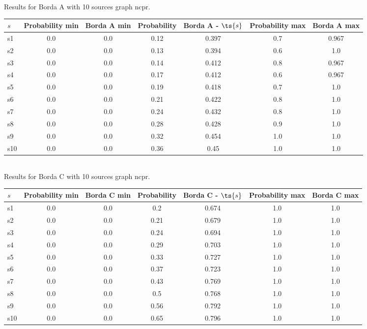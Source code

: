 \documentclass{article}
\begin{document}
\noindent Results for Borda A with 10 sources graph ncpr.

\noindent\begin{tabular}{|l|c|c|c|c|c|c|}
\hline
$s$& Probability min & Borda A min & Probability & Borda A - $\ts{s}$ & Probability max & Borda A max\\
\hline
s1 &0.0 & 0.0 & 0.12 & 0.397 & 0.7 & 0.967\\
\hline
s2 &0.0 & 0.0 & 0.13 & 0.394 & 0.6 & 1.0\\
\hline
s3 &0.0 & 0.0 & 0.14 & 0.412 & 0.8 & 0.967\\
\hline
s4 &0.0 & 0.0 & 0.17 & 0.412 & 0.6 & 0.967\\
\hline
s5 &0.0 & 0.0 & 0.19 & 0.418 & 0.7 & 1.0\\
\hline
s6 &0.0 & 0.0 & 0.21 & 0.422 & 0.8 & 1.0\\
\hline
s7 &0.0 & 0.0 & 0.24 & 0.432 & 0.8 & 1.0\\
\hline
s8 &0.0 & 0.0 & 0.28 & 0.428 & 0.9 & 1.0\\
\hline
s9 &0.0 & 0.0 & 0.32 & 0.454 & 1.0 & 1.0\\
\hline
s10 &0.0 & 0.0 & 0.36 & 0.45 & 1.0 & 1.0\\
\hline
\end{tabular}\\

\noindent Results for Borda C with 10 sources graph ncpr.

\noindent\begin{tabular}{|l|c|c|c|c|c|c|}
\hline
$s$& Probability min & Borda C min & Probability & Borda C - $\ts{s}$ & Probability max & Borda C max\\
\hline
s1 &0.0 & 0.0 & 0.2 & 0.674 & 1.0 & 1.0\\
\hline
s2 &0.0 & 0.0 & 0.21 & 0.679 & 1.0 & 1.0\\
\hline
s3 &0.0 & 0.0 & 0.24 & 0.694 & 1.0 & 1.0\\
\hline
s4 &0.0 & 0.0 & 0.29 & 0.703 & 1.0 & 1.0\\
\hline
s5 &0.0 & 0.0 & 0.33 & 0.727 & 1.0 & 1.0\\
\hline
s6 &0.0 & 0.0 & 0.37 & 0.723 & 1.0 & 1.0\\
\hline
s7 &0.0 & 0.0 & 0.43 & 0.769 & 1.0 & 1.0\\
\hline
s8 &0.0 & 0.0 & 0.5 & 0.768 & 1.0 & 1.0\\
\hline
s9 &0.0 & 0.0 & 0.56 & 0.792 & 1.0 & 1.0\\
\hline
s10 &0.0 & 0.0 & 0.65 & 0.796 & 1.0 & 1.0\\
\hline
\end{tabular}\\
\end{document}
